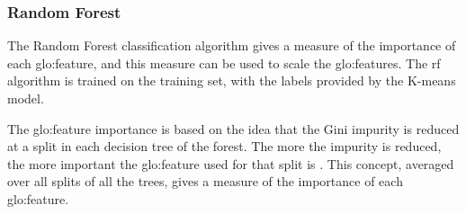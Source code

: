 \begin{table}
    \centering
    \caption{Tuned embedded models parameters}
    \label{tab:axis_models}
    \end{table}

\subsubsection{Random Forest}
The Random Forest classification algorithm gives a measure of the importance of each \gls{glo:feature}, and this measure can be used to scale the \gls{glo:feature}s. The \gls{rf} algorithm is trained on the training set, with the labels provided by the K-means model. 

The \gls{glo:feature} importance is based on the idea that the Gini impurity is reduced at a split in each decision tree of the forest. The more the impurity is reduced, the more important the \gls{glo:feature} used for that split is \cite{RF_featimportance}. This concept, averaged over all splits of all the trees, gives a measure of the importance of each \gls{glo:feature}.

